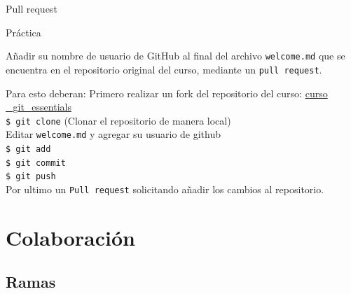 \documentclass{beamer}
\begin{document}
  \begin{frame}{Pull request}


  \end{frame}

\begin{frame}{\LARGE Práctica}
  
  \begin{alertblock}{}

    Añadir su nombre de usuario de GitHub al final del archivo \texttt{welcome.md} que se encuentra en el repositorio original del curso, mediante un \texttt{pull request}. 
    
  \end{alertblock}

  \begin{block}{Para esto deberan:}
    Primero realizar un fork del repositorio del curso: \href{https://github.com/paobtorres/curso_git_essentials}{curso  \_git\_essentials} \\ 
    \texttt{\$ git clone} (Clonar el repositorio de manera local) \\ 
    Editar \texttt{welcome.md} y agregar su usuario de github \\ 
    \texttt{\$ git add} \\ 
    \texttt{\$ git commit} \\ 
    \texttt{\$ git push} \\ 
    Por ultimo un \texttt{Pull request} solicitando añadir los cambios al repositorio. 
  \end{block}



\end{frame}




\section{Colaboración}

\subsection {Ramas}
\end{document}
